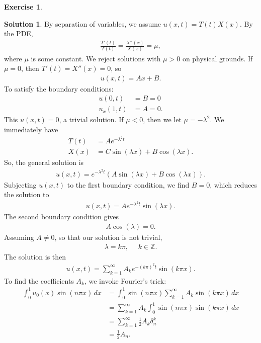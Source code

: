 \documentclass{article}
\theoremstyle{definition}
\newtheorem*{exer*}{Exercise}
\newtheorem*{sln*}{Solution}
\begin{document}
\begin{exer*}
\begin{sln*}
		\noindent By separation of variables, we assume $u(x,t) = T(t)X(x)$. By the PDE, 
		\begin{align*}
		\frac{T'(t)}{T(t)} = \frac{X''(x)}{X(x)} = \mu,
		\end{align*}
		where $\mu$ is some constant. We reject solutions with $\mu > 0$ on physical grounds. If $\mu = 0$, then $T'(t) = X''(x) = 0$, so
		\begin{align*}
		u(x,t) = Ax + B.
		\end{align*}
		To satisfy the boundary conditions:
		\begin{align*}
		u(0,t) &= B = 0\\
		u_x(1,t) &= A = 0.
		\end{align*}
		This $u(x,t) = 0$, a trivial solution. If $\mu < 0$, then we let $\mu = -\lambda^2$. We immediately have
		\begin{align*}
		T(t) &= Ae^{-\lambda^2 t}\\
		X(x) &= C\sin(\lambda x) + B\cos(\lambda x).
		\end{align*}
		So, the general solution is
		\begin{align*}
		u(x,t) = e^{-\lambda^2 t}(A\sin(\lambda x) + B\cos(\lambda x)).
		\end{align*}
		Subjecting $u(x,t)$ to the first boundary condition, we find $B = 0$, which reduces the solution to
		\begin{align*}
		u(x,t) = Ae^{-\lambda^2 t}\sin(\lambda x).
		\end{align*}
		The second boundary condition gives
		\begin{align*}
		A\cos(\lambda)= 0.
		\end{align*}
		Assuming $A\neq 0$, so that our solution is not trivial, 
		\begin{align*}
		\lambda = k\pi,\,\,\,\,\,\,\,\, k\in \mathbb{Z}.
		\end{align*}
		The solution is then
		\begin{align*}
		u(x,t) = \sum_{k=1}^{\infty}A_ke^{-(k\pi)^2t}\sin(k\pi x).
		\end{align*}
		To find the coefficients $A_k$, we invoke Fourier's trick:
		\begin{align*}
		\int_{0}^1 u_0(x)\sin(n\pi x)\,dx &= \int_0^1 \sin(n\pi x)\sum_{k=1}^\infty A_k\sin(k\pi x)\,dx\\
		&= \sum_{k=1}^\infty A_k \int_{0}^1 \sin(n\pi x)\sin(k\pi x)\,dx\\
		&= \sum_{k=1}^\infty \frac{1}{2}A_k\delta^k_n\\
		&= \frac{1}{2}A_n.

\end{align*}
\end{sln*}
\end{exer*}
\end{document}
